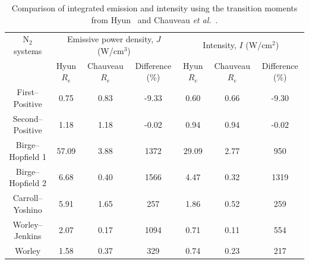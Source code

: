 \begin{table}[h]
 \small
 \center
 \caption{Comparison of integrated emission and intensity using the transition moments from Hyun~\cite{hyun_phd} and Chauveau \textit{et al.}~\cite{CPR+2002}.}
 \label{tab:N2_radiation_compare}
 \begin{tabular*}{0.9\textwidth}{ccccccc}
  \hline N$_2$ systems             & \multicolumn{3}{c}{Emissive power density, $J$ (W/cm$^3$)}        & \multicolumn{3}{c}{Intensity, $I$ (W/cm$^2$)}      \\
                                                      &  Hyun $R_e$  & Chauveau $R_e$ & Difference (\%)                               & Hyun $R_e$  & Chauveau $R_e$ & Difference (\%) \\
  \hline  
        First--Positive                     &    0.75                &      0.83             &      -9.33                                           &    0.60               & 0.66                  &     -9.30             \\
        Second--Positive               &    1.18                &      1.18             &      -0.02                                           &    0.94               & 0.94                  &     -0.02             \\
        Birge--Hopfield 1               &  57.09                &      3.88             &       1372                                          &    29.09            & 2.77                  &      950               \\
        Birge--Hopfield 2               &    6.68                &      0.40             &        1566                                          &      4.47            & 0.32                  &      1319            \\
        Carroll--Yoshino                &    5.91                &      1.65             &        257                                            &      1.86            & 0.52                  &      259               \\
        Worley--Jenkins                &     2.07                &      0.17             &       1094                                           &      0.71            & 0.11                  &     554               \\ 
        Worley                                 &    1.58                &      0.37             &        329                                             &      0.74            & 0.23                  &     217               \\
  \hline
 \end{tabular*}
\end{table}


